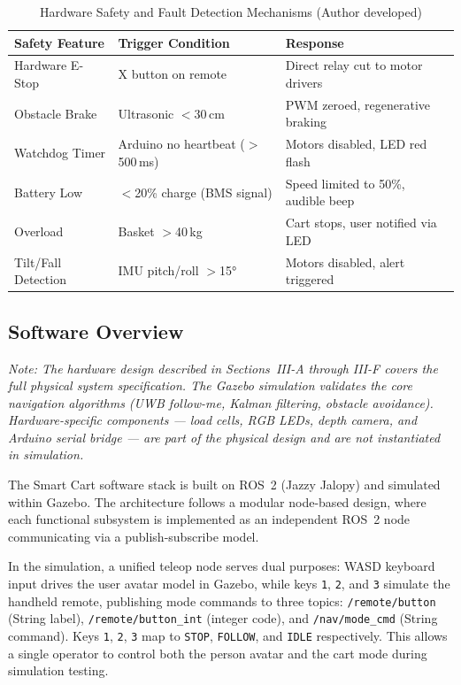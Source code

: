 \begin{table}[!ht]
\caption{Hardware Safety and Fault Detection Mechanisms (Author developed)}
\label{tab:safety}
\centering
\footnotesize
\begin{tabular}{p{1.8cm} p{2.0cm} p{2.8cm}}
\toprule
\textbf{Safety Feature} & \textbf{Trigger Condition} & \textbf{Response} \\
\midrule
Hardware E-Stop & X button on remote & Direct relay cut to motor drivers \\
Obstacle Brake & Ultrasonic $<$30\,cm & PWM zeroed, regenerative braking \\
Watchdog Timer & Arduino no heartbeat ($>$500\,ms) & Motors disabled, LED red flash \\
Battery Low & $<$20\% charge (BMS signal) & Speed limited to 50\%, audible beep \\
Overload & Basket $>$40\,kg & Cart stops, user notified via LED \\
Tilt/Fall Detection & IMU pitch/roll $>$15° & Motors disabled, alert triggered \\
\bottomrule
\end{tabular}
\end{table}

\subsection{Software Overview}

\textit{Note: The hardware design described in Sections~III-A through
III-F covers the full physical system specification. The Gazebo
simulation validates the core navigation algorithms (UWB follow-me,
Kalman filtering, obstacle avoidance). Hardware-specific components ---
load cells, RGB LEDs, depth camera, and Arduino serial bridge --- are
part of the physical design and are not instantiated in simulation.}

The Smart Cart software stack is built on ROS~2 (Jazzy Jalopy)
and simulated within Gazebo. The architecture follows a modular 
node-based design, where each functional subsystem is implemented 
as an independent ROS~2 node communicating via a publish-subscribe 
model.

In the simulation, a unified teleop node serves dual purposes: WASD 
keyboard input drives the user avatar model in Gazebo, while keys 
\texttt{1}, \texttt{2}, and \texttt{3} simulate the handheld remote, 
publishing mode commands to three topics: \texttt{/remote/button}
(String label), \texttt{/remote/button\_int} (integer code), and
\texttt{/nav/mode\_cmd} (String command). Keys \texttt{1}, \texttt{2},
\texttt{3} map to \texttt{STOP}, \texttt{FOLLOW}, and \texttt{IDLE}
respectively. This allows a single operator to control both the person
avatar and the cart mode during simulation testing.

